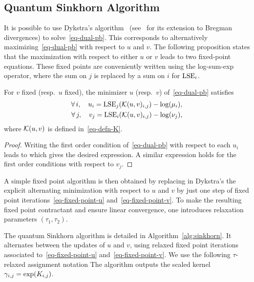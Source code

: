 \subsection{Quantum Sinkhorn Algorithm}

It is possible to use Dykstra's algorithm~ (see~\cite{bauschke-lewis} for its extension to Bregman divergences) to solve~\eqref{eq-dual-pb}. This corresponds to alternatively maximizing~\eqref{eq-dual-pb} with respect to $u$ and $v$. 
%
The following proposition states that the maximization with respect to either $u$ or $v$ leads to two fixed-point equations. 
%
These fixed points are conveniently written using the log-sum-exp operator, 
where the sum on $j$ is replaced by a sum on $i$ for $\operatorname{LSE}_i$. 

\begin{prop}\label{prop-fixed-points}
	For $v$ fixed (resp.\ $u$ fixed), the minimizer $u$ (resp.\ $v$) of~\eqref{eq-dual-pb} satisfies
	\begin{align}\label{eq-fixed-point-u}
		\forall \, i, \quad u_i = \operatorname{LSE}_j(\mathcal{K}(u,v)_{i,j})-\log(\mu_i), \\
		\forall \, j, \quad v_j = \operatorname{LSE}_i(\mathcal{K}(u,v)_{i,j})-\log(\nu_j), \label{eq-fixed-point-v}
	\end{align}
	where $\mathcal{K}(u,v)$ is defined in~\eqref{eq-defn-K}.
\end{prop}
\begin{proof}
	Writing the first order condition of~\eqref{eq-dual-pb} with respect to each $u_i$ leads to
	which gives the desired expression. A similar expression holds for the first order conditions with respect to $v_j$.
\end{proof}

A simple fixed point algorithm is then obtained by replacing in Dykstra's the explicit alternating minimization with respect to $u$ and $v$ by just one step of fixed point iterations~\eqref{eq-fixed-point-u} and~\eqref{eq-fixed-point-v}. To make the resulting fixed point contractant and ensure linear convergence, one introduces relaxation parameters $(\tau_1,\tau_2)$. 

The quantum Sinkhorn algorithm is detailed in Algorithm~\ref{alg:sinkhorn}. It alternates between the updates of $u$ and $v$, using relaxed fixed point iterations associated to~\eqref{eq-fixed-point-u} and~\eqref{eq-fixed-point-v}. We use the following $\tau$-relaxed assignment notation 
The algorithm outputs the scaled kernel $\gamma_{i,j} = \exp(K_{i,j})$.


